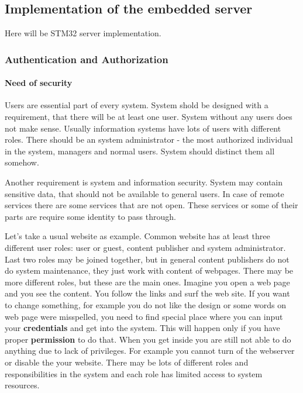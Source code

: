 \newpage
\subsection{Implementation of the embedded server}
Here will be STM32 server implementation.


\subsubsection{Authentication and Authorization}
\paragraph{Need of security}
Users are essential part of every system. System shold be designed with
a requirement, that there will be at least one user. System without any users
does not make sense. Usually information systems have lots of users with
different roles. There should be an system administrator - the most authorized individual
in the system, managers and normal users. System should distinct them all
somehow.

Another requirement is system and information security. System may contain
sensitive data, that should not be available to general users. In case of remote
services there are some services that are not open. These services or some
of their parts are require some identity to pass through. 

Let's take a usual website as example. Common website has at least three
different user roles:
user or guest, content publisher and system administrator. Last two roles may be
joined together, but in general content publishers do not do system maintenance, they
just work with content of webpages. There may be more different roles, but these
are the main ones. Imagine you open a web page and you see the content. You
follow the links and surf the web site. If you want to change something, for
example you do not like the design or some words on web page were misspelled,
you need to find special place where you can input your \textbf{credentials} and
get into the system. This will happen only if you have proper
\textbf{permission} to do that. When you get inside you are still not able to do
anything due to lack of privileges. For example you cannot turn of the
webserver or disable the your website. There may be lots of different roles and
responsibilities in the system and each role has limited access to system
resources.

